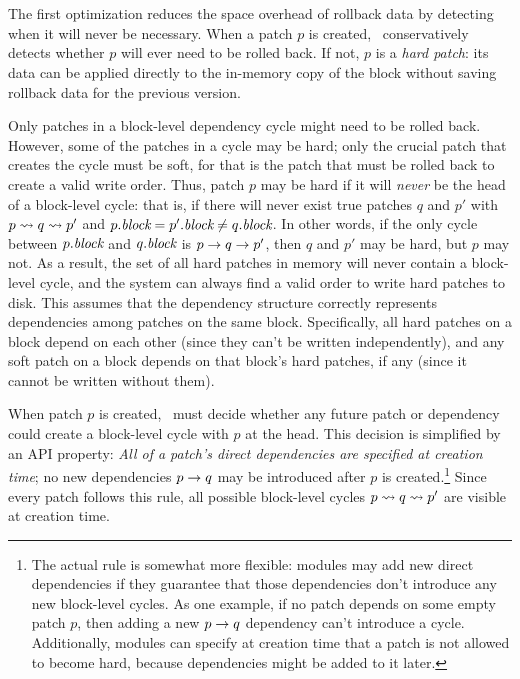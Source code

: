 
\subsection{\Nrb\ \ChDescs}
\label{sec:patch:nrb}

The first optimization reduces the space overhead of rollback data by
detecting when it will never be necessary.
%
When a patch $p$ is created, \Kudos\ conservatively detects whether $p$
will ever need to be rolled back.
%
If not, $p$ is a \emph{hard patch}: its data can be applied
directly to the in-memory copy of the block without saving rollback data
for the previous version.


Only patches in a block-level dependency cycle might need to be rolled
back.
%
However, some of the patches in a cycle may be hard; only the crucial
patch that creates the cycle must be soft, for that is the patch that
must be rolled back to create a valid write order.
%
Thus, patch $p$ may be hard if it will \emph{never} be the head of a
block-level cycle: that is, if there will never exist true patches $q$
and $p'$ with $p \leadsto q \leadsto p'$ and $p.\textit{block} = p'.\textit{block}
\neq q.\textit{block}$.
%
In other words, if the only cycle between $p.\textit{block}$ and $q.\textit{block}$ is $p
\rightarrow q \rightarrow p'$, then $q$ and $p'$ may be hard, but $p$ may
not.
%
As a result, the set of all hard patches in memory will never contain
a block-level cycle, and the system can always find a valid order to
write hard patches to disk.
%
This assumes that the dependency structure correctly represents
dependencies among patches on the same block.
%
Specifically, all hard patches on a block depend on each other (since
they can't be written independently), and any soft patch on a block
depends on that block's hard patches, if any (since it cannot be written
without them).


When patch $p$ is created, \Kudos\ must decide whether any future
patch or dependency could create a block-level cycle with $p$ at the
head.
%
This decision is simplified by an API property: \emph{All of a patch's
direct dependencies are specified at creation time};
%
no new dependencies $p \rightarrow q$ may be introduced after $p$ is
created.\footnote{The actual rule is somewhat more flexible: modules may add
  new direct dependencies if they guarantee that those dependencies
  don't introduce any new block-level cycles.  As one example, if no
  patch depends on some empty patch $p$, then adding a new $p
  \rightarrow q$ dependency can't introduce a cycle.  Additionally,
  modules can specify at creation time that a patch is not allowed to
  become hard, because dependencies might be added to it later.}
%
Since every patch follows this rule, all possible block-level cycles $p
\leadsto q \leadsto p'$ are visible at creation time.


